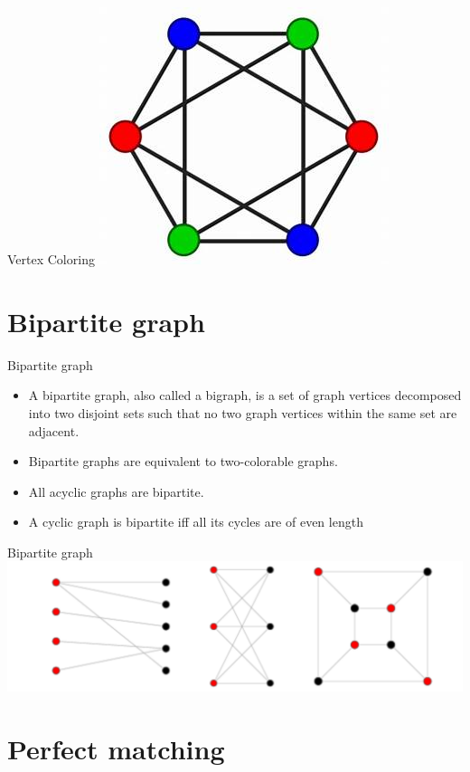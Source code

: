 \documentclass{beamer}
\begin{document}
\begin{frame}{Vertex Coloring}
    \centering \includegraphics[width=.7\linewidth]{p4.jpg}
\end{frame}

\section{Bipartite graph}

\begin{frame}{Bipartite graph}
    \begin{itemize}
        \item A bipartite graph, also called a bigraph, is a set of graph vertices decomposed into two disjoint sets such that no two graph vertices within the same set are adjacent.
        \item Bipartite graphs are equivalent to two-colorable graphs. 
        \item All acyclic graphs are bipartite. 
        \item A cyclic graph is bipartite iff all its cycles are of even length
    \end{itemize}
\end{frame}

\begin{frame}{Bipartite graph}
    \centering \includegraphics[width=.7\linewidth]{p5.PNG}
\end{frame}

\section{Perfect matching}
\end{document}

